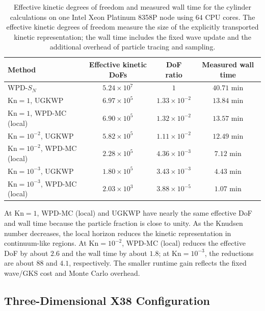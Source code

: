 \documentclass[preprint,12pt]{elsarticle}
\begin{document}
\begin{table}[!htbp]
\centering
\caption{Effective kinetic degrees of freedom and measured wall time for the cylinder calculations on one Intel Xeon Platinum 8358P node using \(64\) CPU cores. The effective kinetic degrees of freedom measure the size of the explicitly transported kinetic representation; the wall time includes the fixed wave update and the additional overhead of particle tracing and sampling.}
\label{tab:cylinder_cost_estimate}
\small
\begin{tabular}{lccc}
\toprule
Method & Effective kinetic DoFs & DoF ratio & Measured wall time \\
\midrule
WPD-\(S_N\) & \(5.24\times10^7\) & \(1\) & \(40.71\) min \\
\midrule
\(\mathrm{Kn}=1\), UGKWP & \(6.97\times10^5\) & \(1.33\times10^{-2}\) & \(13.84\) min \\
\(\mathrm{Kn}=1\), WPD-MC (local) & \(6.90\times10^5\) & \(1.32\times10^{-2}\) & \(13.57\) min \\
\(\mathrm{Kn}=10^{-2}\), UGKWP & \(5.82\times10^5\) & \(1.11\times10^{-2}\) & \(12.49\) min \\
\(\mathrm{Kn}=10^{-2}\), WPD-MC (local) & \(2.28\times10^5\) & \(4.36\times10^{-3}\) & \(7.12\) min \\
\(\mathrm{Kn}=10^{-3}\), UGKWP & \(1.80\times10^5\) & \(3.43\times10^{-3}\) & \(4.43\) min \\
\(\mathrm{Kn}=10^{-3}\), WPD-MC (local) & \(2.03\times10^3\) & \(3.88\times10^{-5}\) & \(1.07\) min \\
\bottomrule
\end{tabular}
\end{table}

At \(\mathrm{Kn}=1\), WPD-MC (local) and UGKWP have nearly the same effective DoF and wall time because the particle fraction is close to unity. As the Knudsen number decreases, the local horizon reduces the kinetic representation in continuum-like regions. At \(\mathrm{Kn}=10^{-2}\), WPD-MC (local) reduces the effective DoF by about \(2.6\) and the wall time by about \(1.8\); at \(\mathrm{Kn}=10^{-3}\), the reductions are about \(88\) and \(4.1\), respectively. The smaller runtime gain reflects the fixed wave/GKS cost and Monte Carlo overhead.

\subsection{Three-Dimensional X38 Configuration}
\end{document}
